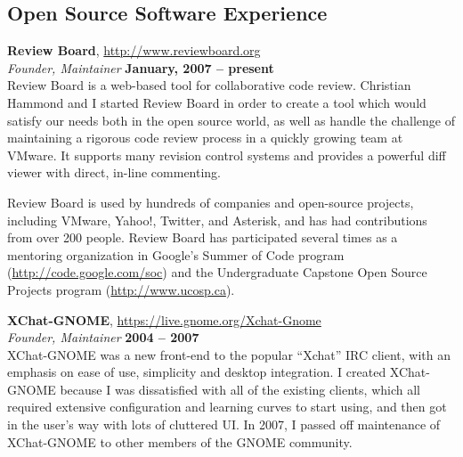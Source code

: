 \documentclass[margin,line]{resume}
\begin{document}
\begin{resume}
    \ifcv
    \else
        \newpage
    \fi

    \section{\mysidestyle Open Source Software Experience}

    {\bf Review Board}, \url{http://www.reviewboard.org} \vspace{2mm}\\\vspace{1mm}%
    {\sl Founder, Maintainer} \hfill {\bf January, 2007 -- present}\\
    Review Board is a web-based tool for collaborative code review. Christian
    Hammond and I started Review Board in order to create a tool which would
    satisfy our needs both in the open source world, as well as handle the
    challenge of maintaining a rigorous code review process in a quickly growing
    team at VMware. It supports many revision control systems and provides a
    powerful diff viewer with direct, in-line commenting.

    Review Board is used by hundreds of companies and open-source projects,
    including VMware, Yahoo!, Twitter, and Asterisk, and has had contributions
    from over 200 people. Review Board has participated several times as a
    mentoring organization in Google's Summer of Code program
    (\url{http://code.google.com/soc}) and the Undergraduate Capstone Open
    Source Projects program (\url{http://www.ucosp.ca}).

    \ifcv
        \newpage
    \fi

    {\bf XChat-GNOME}, \url{https://live.gnome.org/Xchat-Gnome} \vspace{2mm}\\\vspace{1mm}%
    {\sl Founder, Maintainer} \hfill {\bf 2004 -- 2007}\\
    XChat-GNOME was a new front-end to the popular ``Xchat'' IRC client, with an
    emphasis on ease of use, simplicity and desktop integration.  I created
    XChat-GNOME because I was dissatisfied with all of the existing clients,
    which all required extensive configuration and learning curves to start
    using, and then got in the user's way with lots of cluttered UI.
    In 2007, I passed off maintenance of XChat-GNOME to other members of the
    GNOME community.


\end{resume}
\end{document}
